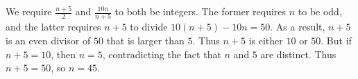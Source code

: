 We require $\frac{n+5}{2}$ and $\frac{10n}{n+5}$ to both be integers. The former requires $n$ to be odd, and the latter requires $n+5$ to divide $10(n+5)-10n=50$. As a result, $n+5$ is an even divisor of $50$ that is larger than $5$. Thus $n+5$ is either $10$ or $50$. But if $n+5=10$, then $n=5$, contradicting the fact that $n$ and $5$ are distinct. Thus $n+5=50$, so $n=45$.